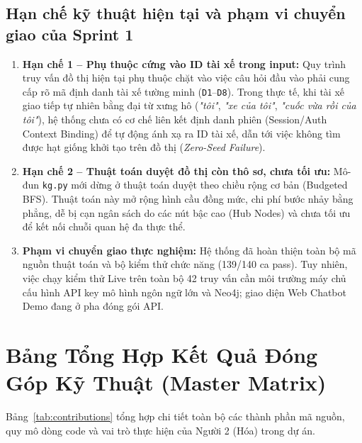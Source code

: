 \documentclass[a4paper,11pt]{article}
\begin{document}
\subsection{Hạn chế kỹ thuật hiện tại và phạm vi chuyển giao của Sprint 1}
\begin{enumerate}[leftmargin=1.5em,noitemsep]
    \item \textbf{Hạn chế 1 -- Phụ thuộc cứng vào ID tài xế trong input:} Quy trình truy vấn đồ thị hiện tại phụ thuộc chặt vào việc câu hỏi đầu vào phải cung cấp rõ mã định danh tài xế tường minh (\texttt{D1}--\texttt{D8}). Trong thực tế, khi tài xế giao tiếp tự nhiên bằng đại từ xưng hô (\textit{"tôi"}, \textit{"xe của tôi"}, \textit{"cuốc vừa rồi của tôi"}), hệ thống chưa có cơ chế liên kết định danh phiên (Session/Auth Context Binding) để tự động ánh xạ ra ID tài xế, dẫn tới việc không tìm được hạt giống khởi tạo trên đồ thị (\textit{Zero-Seed Failure}).
    \item \textbf{Hạn chế 2 -- Thuật toán duyệt đồ thị còn thô sơ, chưa tối ưu:} Mô-đun \nolinkurl{kg.py} mới dừng ở thuật toán duyệt theo chiều rộng cơ bản (Budgeted BFS). Thuật toán này mở rộng hình cầu đồng mức, chi phí bước nhảy bằng phẳng, dễ bị cạn ngân sách do các nút bậc cao (Hub Nodes) và chưa tối ưu để kết nối chuỗi quan hệ đa thực thể.
    \item \textbf{Phạm vi chuyển giao thực nghiệm:} Hệ thống đã hoàn thiện toàn bộ mã nguồn thuật toán và bộ kiểm thử chức năng (139/140 ca pass). Tuy nhiên, việc chạy kiểm thử Live trên toàn bộ 42 truy vấn cần môi trường máy chủ cấu hình API key mô hình ngôn ngữ lớn và Neo4j; giao diện Web Chatbot Demo đang ở pha đóng gói API.
\end{enumerate}

\clearpage
\section{Bảng Tổng Hợp Kết Quả Đóng Góp Kỹ Thuật (Master Matrix)}

Bảng~\ref{tab:contributions} tổng hợp chi tiết toàn bộ các thành phần mã nguồn, quy mô dòng code và vai trò thực hiện của Người 2 (Hóa) trong dự án.
\end{document}
